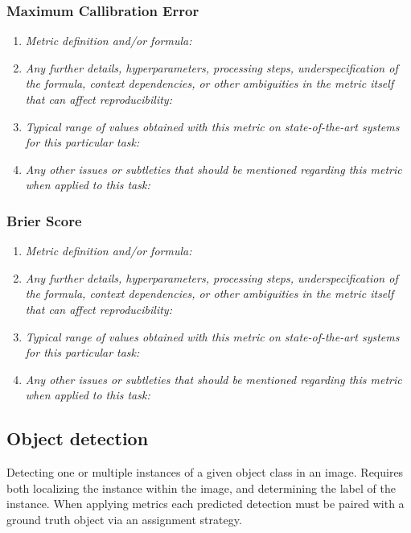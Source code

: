 \documentclass[a4paper,11pt]{article}
\begin{document}
        \subsubsection{Maximum Callibration Error}
            \begin{enumerate}[label=\alph*.]
                \item \textit{Metric definition and/or formula:}
                \bigskip
                \item \textit{Any further details, hyperparameters, processing steps, underspecification of the formula, context dependencies, or other ambiguities in the metric itself that can affect reproducibility:}
                \bigskip
                \item \textit{Typical range of values obtained with this metric on state-of-the-art systems for this particular task:}
                \bigskip
                \item \textit{Any other issues or subtleties that should be mentioned regarding this metric when applied to this task:}
                \bigskip
            \end{enumerate}
        \subsubsection{Brier Score}
            \begin{enumerate}[label=\alph*.]
                \item \textit{Metric definition and/or formula:}
                \bigskip
                \item \textit{Any further details, hyperparameters, processing steps, underspecification of the formula, context dependencies, or other ambiguities in the metric itself that can affect reproducibility:}
                \bigskip
                \item \textit{Typical range of values obtained with this metric on state-of-the-art systems for this particular task:}
                \bigskip
                \item \textit{Any other issues or subtleties that should be mentioned regarding this metric when applied to this task:}
                \bigskip
            \end{enumerate}


    \subsection{Object detection}
        Detecting one or multiple instances of a given object class in an image. Requires both localizing the instance within the image, and determining the label of the instance. When applying metrics each predicted detection must be paired with a ground truth object via an assignment strategy. 
\end{document}
